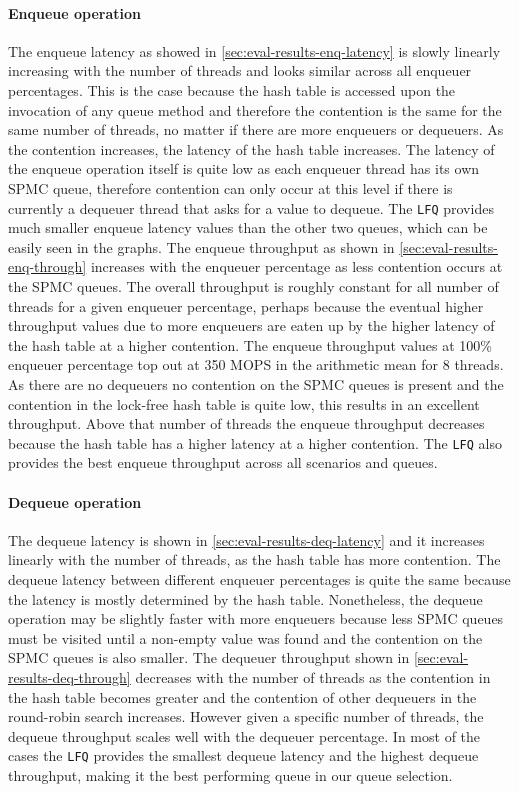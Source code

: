 \documentclass{article}
\newcommand{\LFQ}{\texttt{LFQ}}
\begin{document}
\paragraph{Enqueue operation}
The enqueue latency as showed in \ref{sec:eval-results-enq-latency} is slowly linearly increasing with the number of threads and looks similar across all enqueuer percentages. This is the case because the hash table is accessed upon the invocation of any queue method and therefore the contention is the same for the same number of threads, no matter if there are more enqueuers or dequeuers. As the contention increases, the latency of the hash table increases. The latency of the enqueue operation itself is quite low as each enqueuer thread has its own SPMC queue, therefore contention can only occur at this level if there is currently a dequeuer thread that asks for a value to dequeue. The \LFQ{} provides much smaller enqueue latency values than the other two queues, which can be easily seen in the graphs. The enqueue throughput as shown in \ref{sec:eval-results-enq-through} increases with the enqueuer percentage as less contention occurs at the SPMC queues. The overall throughput is roughly constant for all number of threads for a given enqueuer percentage, perhaps because the eventual higher throughput values due to more enqueuers are eaten up by the higher latency of the hash table at a higher contention. The enqueue throughput values at 100\% enqueuer percentage top out at 350 MOPS in the arithmetic mean for $8$ threads. As there are no dequeuers no contention on the SPMC queues is present and the contention in the lock-free hash table is quite low, this results in an excellent throughput. Above that number of threads the enqueue throughput decreases because the hash table has a higher latency at a higher contention. The \LFQ{} also provides the best enqueue throughput across all scenarios and queues.
\paragraph{Dequeue operation}
The dequeue latency is shown in \ref{sec:eval-results-deq-latency} and it increases linearly with the number of threads, as the hash table has more contention. The dequeue latency between different enqueuer percentages is quite the same because the latency is mostly determined by the hash table. Nonetheless, the dequeue operation may be slightly faster with more enqueuers because less SPMC queues must be visited until a non-empty value was found and the contention on the SPMC queues is also smaller. The dequeuer throughput shown in \ref{sec:eval-results-deq-through} decreases with the number of threads as the contention in the hash table becomes greater and the contention of other dequeuers in the round-robin search increases. However given a specific number of threads, the dequeue throughput scales well with the dequeuer percentage. In most of the cases the \LFQ{} provides the smallest dequeue latency and the highest dequeue throughput, making it the best performing queue in our queue selection.
\end{document}
